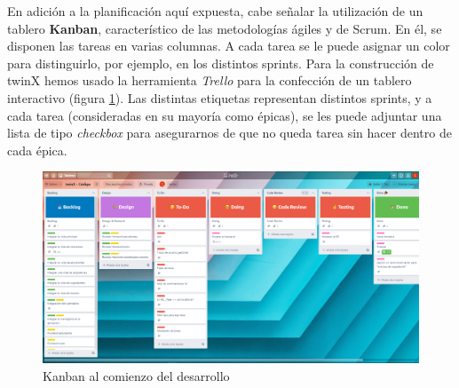 En adición a la planificación aquí expuesta, cabe señalar la utilización de un tablero \textbf{Kanban}, característico de las metodologías ágiles y de Scrum. En él, se disponen las tareas en varias columnas. A cada tarea se le puede asignar un color para distinguirlo, por ejemplo, en los distintos sprints. Para la construcción de twinX hemos usado la herramienta \textit{Trello} para la confección de un tablero interactivo (figura \ref{fig:kanban}). Las distintas etiquetas representan distintos sprints, y a cada tarea (consideradas en su mayoría como épicas), se les puede adjuntar una lista de tipo \textit{checkbox} para asegurarnos de que no queda tarea sin hacer dentro de cada épica.

\begin{figure}
	\centering
	\includegraphics[width=\textwidth]{img/Capturas Kanban/kanban_codigo}
	\caption{Kanban al comienzo del desarrollo}
	\label{fig:kanban}
\end{figure}

